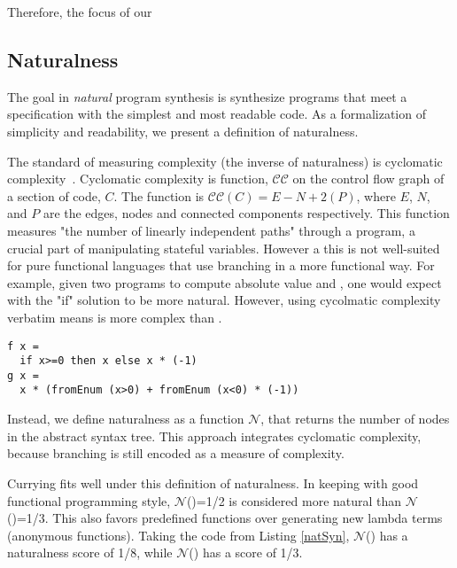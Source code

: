 Therefore, the focus of our 
 

\subsection{Naturalness}
\label{sec:naturalness}

The goal in \textit{natural} program synthesis is synthesize programs that meet a specification with the simplest and most readable code.
As a formalization of simplicity and readability, we present a definition of naturalness.

The standard of measuring complexity (the inverse of naturalness) is cyclomatic complexity~\cite{McCabe:1976:CM:800253.807712}.
Cyclomatic complexity is function, $\mathcal{CC}$ on the control flow graph of a section of code, $C$.
The function is $\mathcal{CC}(C) = E − N + 2(P)$, where $E$, $N$, and $P$ are the edges, nodes and connected components respectively.
This function measures "the number of linearly independent paths" through a program, a crucial part of manipulating stateful variables.
However a this is not well-suited for pure functional languages that use branching in a more functional way.
For example, given two programs to compute absolute value  and , one would expect  with the "if" solution to be more natural.
However, using cycolmatic complexity verbatim means  is more complex than .

\begin{lstlisting}
f x =
  if x>=0 then x else x * (-1)
g x = 
  x * (fromEnum (x>0) + fromEnum (x<0) * (-1))
\end{lstlisting}

Instead, we define naturalness as a function $\mathcal{N}$, that returns the number of nodes in the abstract syntax tree.
This approach integrates cyclomatic complexity, because branching is still encoded as a measure of complexity.

Currying fits well under this definition of naturalness.
In keeping with good functional programming style, $\mathcal{N}$()=1/2 is considered more natural than $\mathcal{N}$()=1/3.
This also favors predefined functions over generating new lambda terms (anonymous functions).
Taking the code from Listing \ref{natSyn}, $\mathcal{N}$() has a naturalness score of 1/8, while $\mathcal{N}$() has a score of 1/3.

